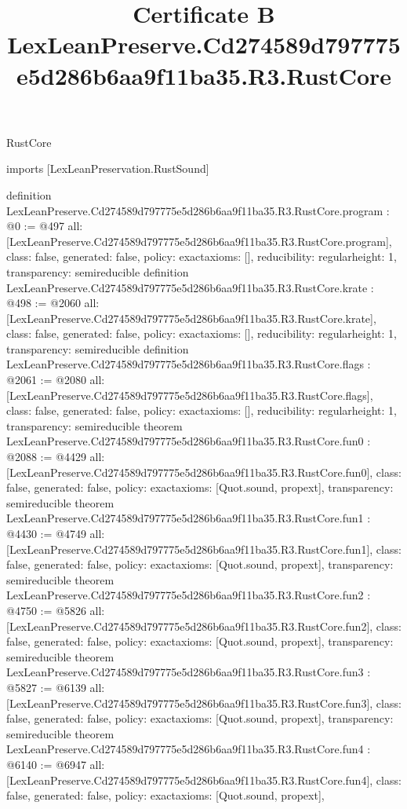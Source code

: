 \begin{lexlean}{RustCore}
\title{Certificate B LexLeanPreserve.Cd274589d797775e5d286b6aa9f11ba35.R3.RustCore}
\begin{coremodule}
imports [LexLeanPreservation.RustSound]

definition LexLeanPreserve.Cd274589d797775e5d286b6aa9f11ba35.R3.RustCore.program : @0 := @497 {
  all: [LexLeanPreserve.Cd274589d797775e5d286b6aa9f11ba35.R3.RustCore.program],
  class: false,
  generated: false,
  policy: exact{axioms: []},
  reducibility: regular{height: 1},
  transparency: semireducible
}
definition LexLeanPreserve.Cd274589d797775e5d286b6aa9f11ba35.R3.RustCore.krate : @498 := @2060 {
  all: [LexLeanPreserve.Cd274589d797775e5d286b6aa9f11ba35.R3.RustCore.krate],
  class: false,
  generated: false,
  policy: exact{axioms: []},
  reducibility: regular{height: 1},
  transparency: semireducible
}
definition LexLeanPreserve.Cd274589d797775e5d286b6aa9f11ba35.R3.RustCore.flags : @2061 := @2080 {
  all: [LexLeanPreserve.Cd274589d797775e5d286b6aa9f11ba35.R3.RustCore.flags],
  class: false,
  generated: false,
  policy: exact{axioms: []},
  reducibility: regular{height: 1},
  transparency: semireducible
}
theorem LexLeanPreserve.Cd274589d797775e5d286b6aa9f11ba35.R3.RustCore.fun0 : @2088 := @4429 {
  all: [LexLeanPreserve.Cd274589d797775e5d286b6aa9f11ba35.R3.RustCore.fun0],
  class: false,
  generated: false,
  policy: exact{axioms: [Quot.sound, propext]},
  transparency: semireducible
}
theorem LexLeanPreserve.Cd274589d797775e5d286b6aa9f11ba35.R3.RustCore.fun1 : @4430 := @4749 {
  all: [LexLeanPreserve.Cd274589d797775e5d286b6aa9f11ba35.R3.RustCore.fun1],
  class: false,
  generated: false,
  policy: exact{axioms: [Quot.sound, propext]},
  transparency: semireducible
}
theorem LexLeanPreserve.Cd274589d797775e5d286b6aa9f11ba35.R3.RustCore.fun2 : @4750 := @5826 {
  all: [LexLeanPreserve.Cd274589d797775e5d286b6aa9f11ba35.R3.RustCore.fun2],
  class: false,
  generated: false,
  policy: exact{axioms: [Quot.sound, propext]},
  transparency: semireducible
}
theorem LexLeanPreserve.Cd274589d797775e5d286b6aa9f11ba35.R3.RustCore.fun3 : @5827 := @6139 {
  all: [LexLeanPreserve.Cd274589d797775e5d286b6aa9f11ba35.R3.RustCore.fun3],
  class: false,
  generated: false,
  policy: exact{axioms: [Quot.sound, propext]},
  transparency: semireducible
}
theorem LexLeanPreserve.Cd274589d797775e5d286b6aa9f11ba35.R3.RustCore.fun4 : @6140 := @6947 {
  all: [LexLeanPreserve.Cd274589d797775e5d286b6aa9f11ba35.R3.RustCore.fun4],
  class: false,
  generated: false,
  policy: exact{axioms: [Quot.sound, propext]},
}
\end{coremodule}
\end{lexlean}

